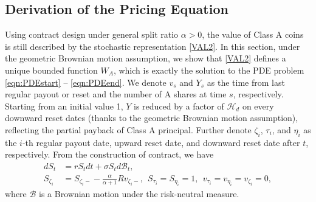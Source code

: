\documentclass[final,pdftex]{ectaart}
\theoremstyle{plain}
\begin{document}
\begin{appendices}

\section{Derivation of the Pricing Equation}
Using contract design under general split ratio $\alpha>0$, the value of Class A coins is still described by the stochastic representation \eqref{VAL2}. In this section, under the geometric Brownian motion assumption, we show that \eqref{VAL2} defines a unique bounded function $W_A$, which is exactly the solution to the PDE problem \eqref{eqn:PDEstart} -- \eqref{eqn:PDEend}. We denote $v_s$ and $Y_s$ as the time from last regular payout or reset and the number of A shares at time $s$, respectively. Starting from an initial value 1, $Y$ is reduced by a factor of $\mathcal{H}_d$ on every downward reset dates (thanks to the geometric Brownian motion assumption), reflecting the partial payback of Class A principal. Further denote $\zeta_i$, $\tau_i$, and $\eta_i$ as the $i$-th regular payout date, upward reset date, and downward reset date after $t$, respectively. From the construction of contract, we have
\begin{align*}
dS_t &= rS_tdt+\sigma S_td\mathcal{B}_t,\\
S_{\zeta_i}&=S_{\zeta_i-}-\frac{\alpha}{\alpha+1}Rv_{\zeta_i-},~~ S_{\tau_i}=S_{\eta_i}=1, ~~v_{\tau_i}=v_{\eta_i}=v_{\zeta_i}=0,
\end{align*}
where $\mathcal{B}$ is a Brownian motion under the risk-neutral measure.


\end{appendices}
\end{document}
